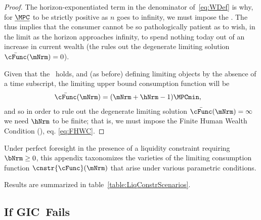 \documentclass[\econtexRoot/BufferStockTheory]{subfiles}
\begin{document}
\begin{proof}
The horizon-exponentiated term in the denominator of~\eqref{eq:WDef} is why, for $\underline{\MPC}$ to be strictly positive as $n$ goes to infinity, we must impose the {\RIC}. The {\RIC} thus implies that the consumer cannot be so pathologically patient as to wish, in the limit as the horizon approaches infinity, to spend nothing today out of an increase in current wealth (the {\RIC} rules out the degenerate limiting solution $\bar{\cFunc}(\mNrm)=0$).  


\hypertarget{Unconstrained-Solution}{}\hypertarget{PF-Unconstrained-Solution}{}

Given that the {\RIC}~holds, and (as before) defining limiting objects by the absence of a time subscript, the limiting upper bound consumption function will be
\begin{align}\label{eq:cFuncPFUnc}
  \bar{\cFunc}(\mNrm)  & = (\mNrm+\hNrm-1)\MPCmin,
\end{align}
and so in order to rule out the degenerate limiting solution $\bar{\cFunc}(\mNrm) = \infty$ we need $\hNrm$ to be finite; that is, we must impose the Finite Human Wealth Condition ({\FHWC}), eq. \eqref{eq:FHWC}.

\end{proof}

Under perfect foresight in the presence of a liquidity constraint requiring $\bNrm \geq 0$, this appendix taxonomizes the varieties of the limiting consumption function $\cnstr{\cFunc}(\mNrm)$ that arise under various parametric conditions.



Results are summarized in table~\ref{table:LiqConstrScenarios}.

\subsection{If {GIC}~Fails}
\end{document}
